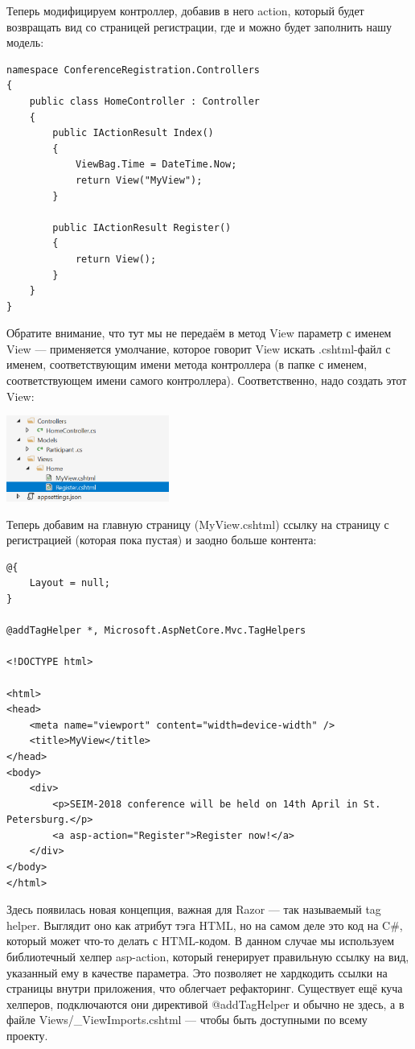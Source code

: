 \documentclass[a5paper]{article}
\begin{document}
Теперь модифицируем контроллер, добавив в него action, который будет возвращать вид со страницей регистрации, где и можно будет заполнить нашу модель:

\begin{verbatim}
namespace ConferenceRegistration.Controllers
{
    public class HomeController : Controller
    {
        public IActionResult Index()
        {
            ViewBag.Time = DateTime.Now;
            return View("MyView");
        }

        public IActionResult Register()
        {
            return View();
        }
    }
}
\end{verbatim}

Обратите внимание, что тут мы не передаём в метод View параметр с именем View --- применяется умолчание, которое говорит View искать .cshtml-файл с именем, соответствующим имени метода контроллера (в папке с именем, соответствующем имени самого контроллера).
Соответственно, надо создать этот View:

\begin{center}
	\includegraphics[width=0.4\textwidth]{secondView.png}
\end{center}

Теперь добавим на главную страницу (MyView.cshtml) ссылку на страницу с регистрацией (которая пока пустая) и заодно больше контента:

\begin{verbatim}
@{
    Layout = null;
}

@addTagHelper *, Microsoft.AspNetCore.Mvc.TagHelpers

<!DOCTYPE html>

<html>
<head>
    <meta name="viewport" content="width=device-width" />
    <title>MyView</title>
</head>
<body>
    <div>
        <p>SEIM-2018 conference will be held on 14th April in St. Petersburg.</p>
        <a asp-action="Register">Register now!</a>
    </div>
</body>
</html>
\end{verbatim}

Здесь появилась новая концепция, важная для Razor --- так называемый tag helper. Выглядит оно как атрибут тэга HTML, но на самом деле это код на C\#, который может что-то делать с HTML-кодом. В данном случае мы используем библиотечный хелпер asp-action, который
генерирует правильную ссылку на вид, указанный ему в качестве параметра. Это позволяет не хардкодить ссылки на страницы внутри приложения, что облегчает рефакторинг. Существует ещё куча хелперов, подключаются они директивой @addTagHelper и обычно не здесь, а в файле
Views/\_ViewImports.cshtml --- чтобы быть доступными по всему проекту.
\end{document}
